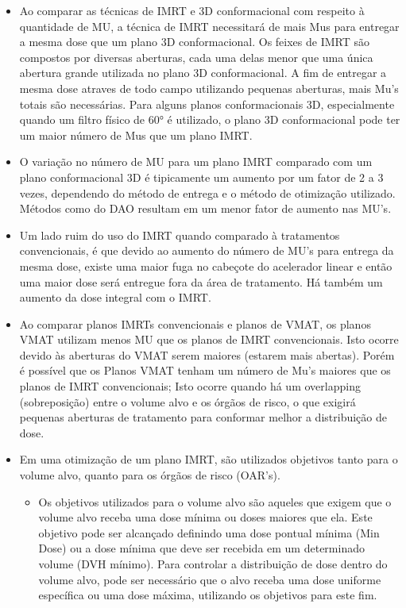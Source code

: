 \documentclass[11pt,a4paper]{article}
\newcounter{exemplo}
\begin{document}
\begin{exemplo}
\begin{itemize}
        \item Ao comparar as técnicas de IMRT e 3D conformacional com respeito à quantidade de MU, a técnica de IMRT necessitará de mais Mus para entregar a mesma dose que um plano 3D conformacional. Os feixes de IMRT são compostos por diversas aberturas, cada uma delas menor que uma única abertura grande utilizada no plano 3D conformacional. A fim de entregar a mesma dose atraves de todo campo utilizando pequenas aberturas, mais Mu's totais são necessárias. Para alguns planos conformacionais 3D, especialmente quando um filtro físico de \ang{60} é utilizado, o plano 3D conformacional pode ter um maior número de Mus que um plano IMRT. 
        
        \item O variação no número de MU para um plano IMRT comparado com um plano conformacional 3D é tipicamente um aumento por um fator de 2 a 3 vezes, dependendo do método de entrega e o método de otimização utilizado. Métodos como do DAO resultam em um menor fator de aumento nas MU's.
        
        \item Um lado ruim do uso do IMRT quando comparado à tratamentos convencionais, é que devido ao aumento do número de MU's para entrega da mesma dose, existe uma maior fuga no cabeçote do acelerador linear e então uma maior dose será entregue fora da área de tratamento. Há também um aumento da dose integral com o IMRT.
        
        \item Ao comparar planos IMRTs convencionais e planos de VMAT, os planos VMAT utilizam menos MU que os planos de IMRT convencionais. Isto ocorre devido às aberturas do VMAT serem maiores (estarem mais abertas). Porém é possível que os Planos VMAT tenham um número de Mu's maiores que os planos de IMRT convencionais; Isto ocorre quando há um overlapping (sobreposição) entre o volume alvo e os órgãos de risco, o que exigirá pequenas aberturas de tratamento para conformar melhor a distribuição de dose. 
        
        \item Em uma otimização de um plano IMRT, são utilizados objetivos tanto para o volume alvo, quanto para os órgãos de risco (OAR's). 
        
            \begin{itemize}[label=\textcolor{CarnationPink}{\textopenbullet}]
                \item  Os objetivos utilizados para o volume alvo são aqueles que exigem que o volume alvo receba uma dose mínima ou doses maiores que ela. Este objetivo pode ser alcançado definindo uma dose pontual mínima (Min Dose) ou a dose mínima que deve ser recebida em um determinado volume (DVH mínimo). Para controlar a distribuição de dose dentro do volume alvo, pode ser necessário que o alvo receba uma dose uniforme específica ou uma dose máxima, utilizando os objetivos para este fim.
                

\end{itemize}
\end{itemize}
\end{exemplo}
\end{document}

